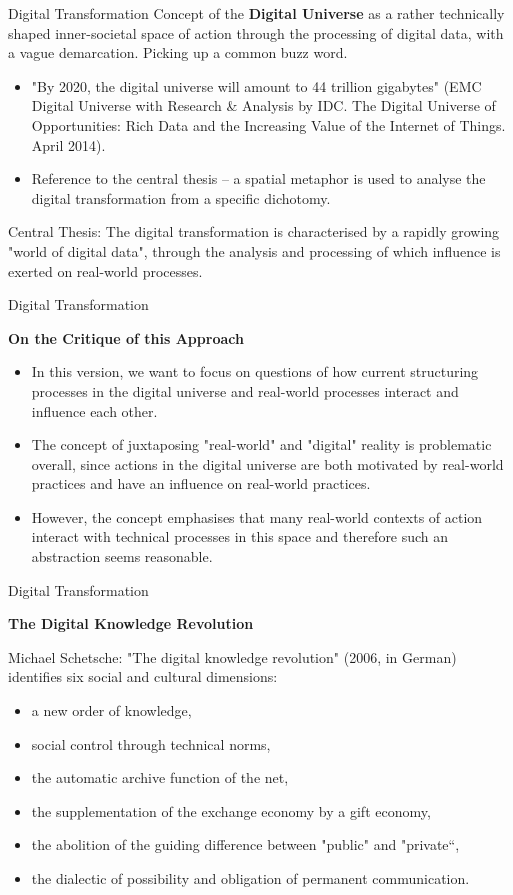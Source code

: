 \documentclass{beamer}
\newcommand{\ueberschrift}[1]{\begin{center}\bf #1\end{center}}
\begin{document}
\begin{frame}{Digital Transformation}
  Concept of the \textbf{Digital Universe} as a rather technically shaped
  inner-societal space of action through the processing of digital data, with
  a vague demarcation.  Picking up a common buzz word.
\begin{itemize}
\item "By 2020, the digital universe will amount to 44 trillion gigabytes"
  (EMC Digital Universe with Research \& Analysis by IDC. The Digital Universe
  of Opportunities: Rich Data and the Increasing Value of the Internet of
  Things. April 2014).
\item Reference to the central thesis -- a spatial metaphor is used to analyse
  the digital transformation from a specific dichotomy.
\end{itemize}
\begin{block}{Central Thesis:}
  The digital transformation is characterised by a rapidly growing "world of
  digital data", through the analysis and processing of which influence is
  exerted on real-world processes.
\end{block}
\end{frame}
\begin{frame}{Digital Transformation}
  \ueberschrift{On the Critique of this Approach}
  \begin{itemize}
  \item In this version, we want to focus on questions of how current
    structuring processes in the digital universe and real-world processes
    interact and influence each other.
  \item The concept of juxtaposing "real-world" and "digital" reality is
    problematic overall, since actions in the digital universe are both
    motivated by real-world practices and have an influence on real-world
    practices.
 \item However, the concept emphasises that many real-world contexts of action
   interact with technical processes in this space and therefore such an
   abstraction seems reasonable.
  \end{itemize}
\end{frame}
\begin{frame}{Digital Transformation}
  \ueberschrift{The Digital Knowledge Revolution}

Michael Schetsche: "The digital knowledge revolution" (2006, in German)
identifies six social and cultural dimensions:
\begin{itemize}
\item a new order of knowledge,
\item social control through technical norms,
\item the automatic archive function of the net,
\item the supplementation of the exchange economy by a gift economy,
\item the abolition of the guiding difference between "public" and "private“, 
\item the dialectic of possibility and obligation of permanent communication.
\end{itemize}
\end{frame}
\end{document}
